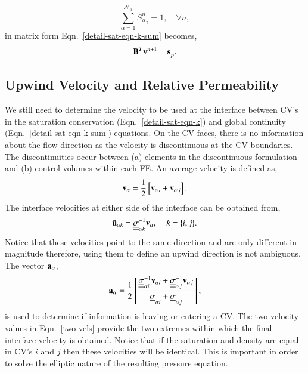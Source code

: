 \documentclass[preprint,authoryear,12pt]{elsarticle}
\newcommand{\frc}{\displaystyle\frac}
\begin{document}
\begin{equation}
  \sum\limits_{\alpha=1}^{\mathcal{N}_{\alpha}} {S_{\alpha}^{n}}_{i} = 1, \quad \forall n,
\end{equation}
in matrix form Eqn.~\ref{detail-sat-eqn-k-sum} becomes,
\begin{equation}
  {\mathbf B}^T \underline{\bf v}^{n+1} = \underline{\bf s}_{p}.
  \label{glob-cty-matrix}
\end{equation}


\subsection{Upwind Velocity and Relative Permeability} \label{opt-up} 
We still need to determine the velocity to be used at the interface between CV's in the saturation conservation (Eqn.~\ref{detail-sat-eqn-k}) and global continuity (Eqn.~\ref{detail-sat-eqn-k-sum}) equations. On the CV faces, there is no information about the flow direction as the velocity is discontinuous at the CV boundaries. The discontinuities occur between (a) elements in the discontinuous formulation and (b) control volumes within each FE. An average velocity is defined as,
\begin{equation}
  {\bf v}_\alpha = \frac{1}{2} \left[ {{\bf v}_\alpha}_i + {{\bf v}_\alpha}_j \right].
\end{equation} 
The interface velocities at either side of the interface can be obtained from,
\begin{equation}
  {\tilde{\bf u}}_{\alpha k} = \underline{\underline{\sigma}}_{\alpha k}^{-1}{{\bf v}}_{\alpha}, \;\;\;\; k=\{i,j\}. 
  \label{two-vels}
\end{equation} 
Notice that these velocities point to the same direction and are only different in magnitude therefore, using them to define an upwind direction is not ambiguous. The vector ${\bf a}_{\alpha}$,
\begin{equation}
  {\bf a}_{\alpha} = \frc{1}{2} \left[\frc{ \underline{\underline{\sigma}}_{\alpha i}^{-1}{{\bf v}}_{\alpha i} +  \underline{\underline{\sigma}}_{\alpha j}^{-1}{{\bf v}}_{\alpha j} } { \underline{\underline{\sigma}}_{\alpha i} + \underline{\underline{\sigma}}_{\alpha j} }\right],
\end{equation} 
is used to determine if information is leaving or entering a CV. The two velocity values in Eqn.~\ref{two-vels} provide the two extremes within which the final interface velocity is obtained. Notice that if the saturation and density are equal in CV's $i$ and $j$ then these velocities will be identical. This is important in order to solve the elliptic nature of the resulting pressure equation.
\end{document}
